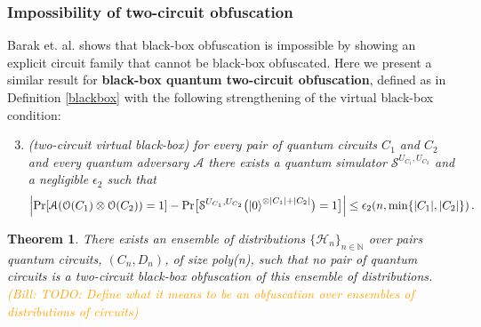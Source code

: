 \documentclass[11pt]{article}
\numberwithin{equation}{section}
\newtheorem{theorem}{Theorem}
\newcommand{\wf}[1]{{ \textcolor{orange}{(Bill:  #1)}}{}}
\begin{document}
\subsubsection{Impossibility of two-circuit obfuscation}
Barak et. al. \cite{BGIRSVY12} shows that black-box obfuscation is impossible by showing an explicit circuit family that cannot be black-box obfuscated.  Here we present a similar result for {\bf black-box quantum two-circuit obfuscation},  defined as in Definition \ref{blackbox} with the following strengthening of the virtual black-box condition:
\begin{enumerate}
\setcounter{enumi}{2}
\item \emph{(two-circuit virtual black-box) for every pair of quantum circuits $C_1$ and $C_2$ and every quantum adversary $\mathcal A$ there exists a quantum simulator $\mathcal S^{U_{C_1}, U_{C_2}}$ and a negligible $\epsilon_2$ such that}
$$
\Bigl| \text{Pr}[\mathcal A(\mathcal O(C_1) \otimes \mathcal O(C_2)) = 1] - \text{Pr}\bigl[\mathcal S^{U_{C_1}, U_{C_2}}\bigl({\left\vert{0}\right\rangle}^{\otimes |C_1| + |C_2|}\bigr) = 1\bigr] \Bigr| \leq \epsilon_2(n, \min\{|C_1|,|C_2|\})\,.
$$
\end{enumerate}
\begin{theorem}
There exists an ensemble of distributions $\lbrace\mathcal{H}_n\rbrace_{n\in\mathbb{N}}$ over pairs quantum circuits, $(C_n, D_n)$, of size poly(n), such that no pair of quantum circuits is a two-circuit black-box obfuscation of this ensemble of distributions. \wf{TODO: Define what it means to be an obfuscation over ensembles of distributions of circuits}
\end{theorem}
\end{document}
